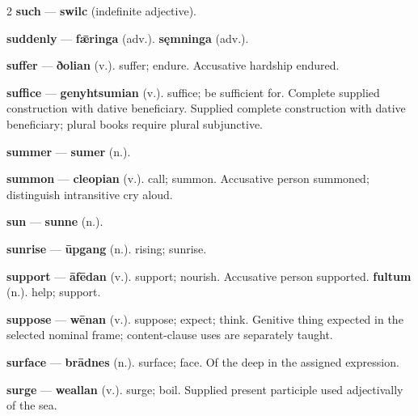 \begin{multicols}{2}
\textbf{such} — \textbf{swilc} (indefinite adjective).\par
\textbf{suddenly} — \textbf{fǣringa} (adv.).  \textbf{sęmninga} (adv.).\par
\textbf{suffer} — \textbf{ðolian} (v.). suffer; endure. Accusative hardship endured.\par
\textbf{suffice} — \textbf{genyhtsumian} (v.). suffice; be sufficient for. Complete supplied construction with dative beneficiary. Supplied complete construction with dative beneficiary; plural books require plural subjunctive.\par
\textbf{summer} — \textbf{sumer} (n.).\par
\textbf{summon} — \textbf{cleopian} (v.). call; summon. Accusative person summoned; distinguish intransitive cry aloud.\par
\textbf{sun} — \textbf{sunne} (n.).\par
\textbf{sunrise} — \textbf{ūpgang} (n.). rising; sunrise.\par
\textbf{support} — \textbf{āfēdan} (v.). support; nourish. Accusative person supported. \textbf{fultum} (n.). help; support.\par
\textbf{suppose} — \textbf{wēnan} (v.). suppose; expect; think. Genitive thing expected in the selected nominal frame; content-clause uses are separately taught.\par
\textbf{surface} — \textbf{brādnes} (n.). surface; face. Of the deep in the assigned expression.\par
\textbf{surge} — \textbf{weallan} (v.). surge; boil. Supplied present participle used adjectivally of the sea.\par

\end{multicols}
